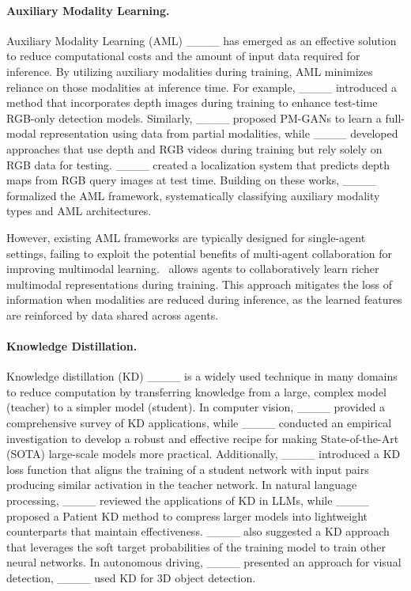 \paragraph{Auxiliary Modality Learning.}
Auxiliary Modality Learning (AML) ____ has emerged as an effective solution to reduce computational costs and the amount of input data required for inference. By utilizing auxiliary modalities during training, AML minimizes reliance on those modalities at inference time. For example, ____ introduced a method that incorporates depth images during training to enhance test-time RGB-only detection models. Similarly, ____ proposed PM-GANs to learn a full-modal representation using data from partial modalities, while ____ developed approaches that use depth and RGB videos during training but rely solely on RGB data for testing. ____ created a localization system that predicts depth maps from RGB query images at test time. Building on these works, ____ formalized the AML framework, systematically classifying auxiliary modality types and AML architectures.

However, existing AML frameworks are typically designed for single-agent settings, failing to exploit the potential benefits of multi-agent collaboration for improving multimodal learning. \ours~allows agents to collaboratively learn richer multimodal representations during training. This approach mitigates the loss of information when modalities are reduced during inference, as the learned features are reinforced by data shared across agents.

\paragraph{Knowledge Distillation.}
Knowledge distillation (KD) ____ is a widely used technique in many domains to reduce computation by transferring knowledge from a large, complex model (teacher) to a simpler model (student). In computer vision, ____ provided a comprehensive survey of KD applications, while ____ conducted an empirical investigation to develop a robust and effective recipe for making State-of-the-Art (SOTA) large-scale models more practical. Additionally, ____ introduced a KD loss function that aligns the training of a student network with input pairs producing similar activation in the teacher network. In natural language processing, ____ reviewed the applications of KD in LLMs, while ____ proposed a Patient KD method to compress larger models into lightweight counterparts that maintain effectiveness. ____ also suggested a KD approach that leverages the soft target probabilities of the training model to train other neural networks. In autonomous driving, ____ presented an approach for visual detection, ____ used KD for 3D object detection.

